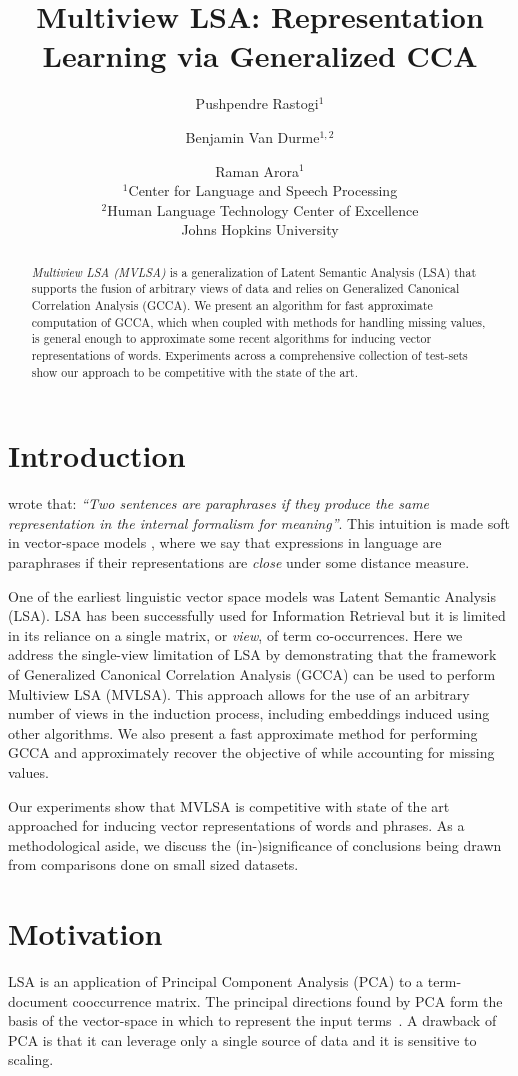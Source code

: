 \documentclass[11pt]{article}
\title{Multiview LSA: Representation Learning via Generalized CCA}
\author{Pushpendre Rastogi$^1$ \and Benjamin Van Durme$^{1,2}$ \and Raman Arora$^{1}$\\
  $^1$Center for Language and Speech Processing\\
    $^2$Human Language Technology Center of Excellence\\
    Johns Hopkins University}
\date{}
\begin{document}
\maketitle
\begin{abstract}
  \emph{Multiview LSA (MVLSA)} is a generalization of Latent Semantic
  Analysis (LSA) that supports the  
  fusion of arbitrary views of data and relies on Generalized Canonical Correlation
  Analysis (GCCA). We present an algorithm
  for fast approximate computation of GCCA, which when coupled with methods
  for handling missing values, is general enough to approximate
  some recent algorithms for inducing vector representations of
  words. Experiments across a comprehensive 
  collection of test-sets show our approach to be competitive with the
  state of the art.   
\end{abstract}

\section{Introduction}
 wrote that: \emph{``Two sentences
  are paraphrases if they produce the same representation in the
  internal formalism for meaning''}.  This intuition is made soft in
vector-space models \cite{turney2010frequency}, where we say that
expressions in language are paraphrases if
their representations are \emph{close} under some distance measure.

One of the earliest linguistic vector space models was Latent
Semantic Analysis (LSA). LSA has been successfully used 
for Information Retrieval but it is limited in its
reliance on a single matrix, or \emph{view}, of term co-occurrences.
Here we address the single-view limitation of LSA by demonstrating
that the framework of Generalized Canonical Correlation Analysis
(GCCA) can be used to perform Multiview LSA (MVLSA). This
approach allows for the use of an arbitrary number of views in the
induction process, including embeddings induced using other
algorithms. We also present a fast approximate method for performing
GCCA and approximately recover the objective of
\cite{pennington2014glove} while accounting for missing values. 

Our experiments show that MVLSA is competitive with state of the art
approached for inducing vector representations of words and phrases.
As a methodological aside, we discuss the (in-)significance of
conclusions being drawn from comparisons done on small sized datasets.

\section{Motivation} 
LSA is an application of Principal Component Analysis (PCA) to a
term-document cooccurrence matrix.  The principal directions found by
PCA form the basis of the vector-space in which to represent the input
terms~\cite{landauer1997solution}. A drawback of PCA is that it can
leverage only a single source of data and it is sensitive to scaling.
\end{document}
